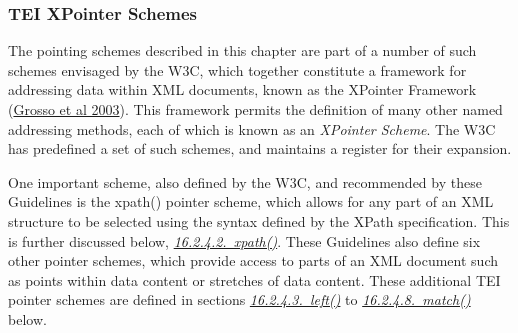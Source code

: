 \subsubsection[{TEI XPointer Schemes}]{TEI XPointer Schemes}\label{SATS}\par
The pointing schemes described in this chapter are part of a number of such schemes envisaged by the W3C, which together constitute a framework for addressing data within XML documents, known as the XPointer Framework (\hyperref[XPTRFMWK]{Grosso et al 2003}). This framework permits the definition of many other named addressing methods, each of which is known as an \textit{XPointer Scheme}. The W3C has predefined a set of such schemes, and maintains a register for their expansion.\par
One important scheme, also defined by the W3C, and recommended by these Guidelines is the  {\name xpath()} pointer scheme, which allows for any part of an XML structure to be selected using the syntax defined by the XPath specification. This is further discussed below, \textit{\hyperref[SATSXP]{16.2.4.2.\ xpath()}}. These Guidelines also define six other pointer schemes, which provide access to parts of an XML document such as points within data content or stretches of data content. These additional TEI pointer schemes are defined in sections \textit{\hyperref[SATSL]{16.2.4.3.\ left()}} to \textit{\hyperref[SATSMA]{16.2.4.8.\ match()}} below.
